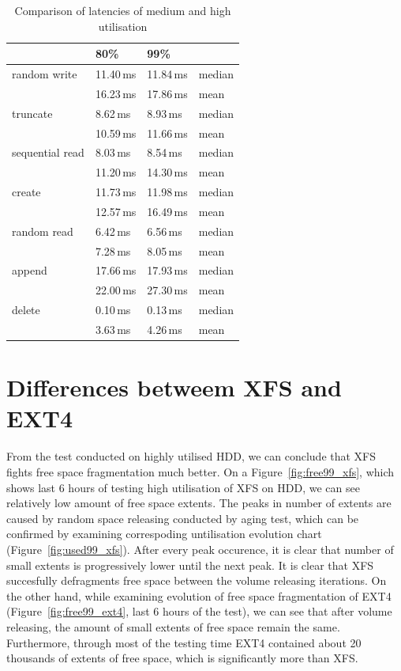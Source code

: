 \documentclass[
  color, %
  table, %
  lof,   %
  lot,   %
]{fithesis3}
\begin{document}
\begin{table}
\centering
\begin{tabular}{|l|l|l|l|}
\hline
 &80\% & 99\% &  \\
\hline
    random write & 11.40\,ms & 11.84\,ms & median \\
 \hline
                 & 16.23\,ms & 17.86\,ms& mean\\
    \hline
        truncate & 8.62\,ms & 8.93\,ms & median\\
    \hline
                 &  10.59\,ms & 11.66\,ms & mean \\
    \hline
           sequential read &  8.03\,ms & 8.54\,ms & median\\
    \hline
                 & 11.20\,ms & 14.30\,ms & mean \\
    \hline
          create & 11.73\,ms & 11.98\,ms & median\\
    \hline
                 & 12.57\,ms & 16.49\,ms & mean \\
    \hline
     random read & 6.42\,ms &6.56\,ms& median\\
    \hline
                 & 7.28\,ms & 8.05\,ms & mean \\
    \hline
          append & 17.66\,ms & 17.93\,ms & median\\
    \hline
                 & 22.00\,ms & 27.30\,ms & mean \\
    \hline
          delete & 0.10\,ms & 0.13\,ms & median\\
    \hline
                & 3.63\,ms & 4.26\,ms & mean \\
    \hline
\end{tabular}
\caption{Comparison of latencies of medium and high utilisation}
\label{tab:99_vs_80}
\end{table}


\section{Differences betweem XFS and EXT4}
From the test conducted on highly utilised  HDD, we can conclude that  XFS fights free space fragmentation much better. On a Figure~\ref{fig:free99_xfs}, which shows last 6 hours of testing high utilisation of XFS on HDD, we can see relatively low amount of free space extents. The peaks in number of extents are caused by random space releasing conducted by aging test, which can be confirmed by examining correspoding untilisation evolution chart (Figure~\ref{fig:used99_xfs}). After every peak occurence, it is clear that number of small extents is progressively lower until the next peak. It is clear that XFS succesfully defragments free space between the volume releasing iterations. On the other hand, while examining evolution of free space fragmentation of EXT4 (Figure~\ref{fig:free99_ext4}, last 6 hours of the test), we can see that after volume releasing, the amount of small extents of free space remain the same. Furthermore, through most of the testing time EXT4 contained about 20 thousands of extents of free space, which is significantly more than XFS.
\end{document}
